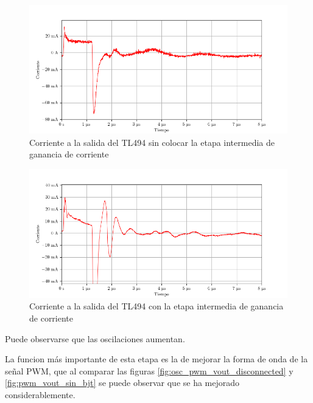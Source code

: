 \begin{figure}[H]
    \centering
    \includegraphics[width=\textwidth]{images/capturas-osciloscopio/TL494/pwm_iout_sin_bjt.png}
    \caption{Corriente a la salida del TL494 sin colocar la etapa intermedia de ganancia de corriente}
    \label{fig:pwm_iout_sin_bjt}
\end{figure}

\begin{figure}[H]
    \centering
    \includegraphics[width=\textwidth]{images/capturas-osciloscopio/BJT/bjt-iin-con-etapa.png}
    \caption{Corriente a la salida del TL494 con la etapa intermedia de ganancia de corriente}
    \label{fig:pwm_iout_con_bjt}
\end{figure}

Puede observarse que las oscilaciones aumentan. %

La funcion más importante de esta etapa es la de mejorar la forma de onda de la señal PWM, que al comparar las figuras \ref{fig:osc_pwm_vout_disconnected} y \ref{fig:pwm_vout_sin_bjt} se puede observar que se ha mejorado considerablemente.

